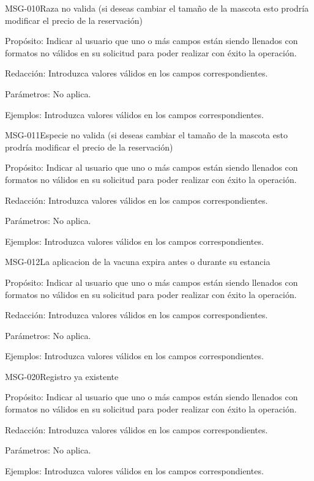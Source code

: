 \begin{cdtMessage}[msgErrorColor]{MSG-010}{Raza no valida (si deseas cambiar el tamaño de la mascota esto prodría modificar el precio de la reservación)}
	\item[Propósito:] Indicar al usuario que uno o más campos están siendo llenados con formatos no válidos en su solicitud para poder realizar con éxito la operación.
	\item[Redacción:] Introduzca valores válidos en los campos correspondientes.
	\item[Parámetros:] No aplica.
	\item[Ejemplos:] Introduzca valores válidos en los campos correspondientes.
\end{cdtMessage}
\begin{cdtMessage}[msgErrorColor]{MSG-011}{Especie no valida (si deseas cambiar el tamaño de la mascota esto prodría modificar el precio de la reservación)}
	\item[Propósito:] Indicar al usuario que uno o más campos están siendo llenados con formatos no válidos en su solicitud para poder realizar con éxito la operación.
	\item[Redacción:] Introduzca valores válidos en los campos correspondientes.
	\item[Parámetros:] No aplica.
	\item[Ejemplos:] Introduzca valores válidos en los campos correspondientes.
\end{cdtMessage}
\begin{cdtMessage}[msgErrorColor]{MSG-012}{La aplicacion de la vacuna expira antes o durante su estancia}
	\item[Propósito:] Indicar al usuario que uno o más campos están siendo llenados con formatos no válidos en su solicitud para poder realizar con éxito la operación.
	\item[Redacción:] Introduzca valores válidos en los campos correspondientes.
	\item[Parámetros:] No aplica.
	\item[Ejemplos:] Introduzca valores válidos en los campos correspondientes.
\end{cdtMessage}
\begin{cdtMessage}[msgErrorColor]{MSG-020}{Registro ya existente}
	\item[Propósito:] Indicar al usuario que uno o más campos están siendo llenados con formatos no válidos en su solicitud para poder realizar con éxito la operación.
	\item[Redacción:] Introduzca valores válidos en los campos correspondientes.
	\item[Parámetros:] No aplica.
	\item[Ejemplos:] Introduzca valores válidos en los campos correspondientes.
\end{cdtMessage}